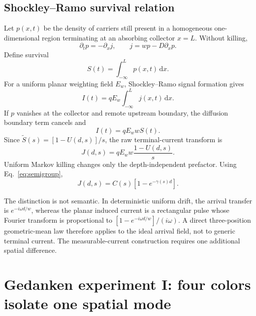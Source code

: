 \documentclass[11pt]{article}
\newcommand{\dd}{\mathrm{d}}
\begin{document}
\subsection{Shockley--Ramo survival relation}

Let $p(x,t)$ be the density of carriers still present in a homogeneous one-dimensional region terminating at an absorbing collector $x=L$. Without killing,
\begin{equation}
\partial_t p=-\partial_x j,
\qquad
j=wp-D\partial_xp.
\label{eq:continuity}
\end{equation}
Define survival
\begin{equation}
S(t)=\int_{-\infty}^{L}p(x,t)\,\dd x.
\end{equation}
For a uniform planar weighting field $E_w$, Shockley--Ramo signal formation \cite{Shockley1938,Ramo1939,Dabrowski1989} gives
\begin{equation}
I(t)=qE_w\int_{-\infty}^{L}j(x,t)\,\dd x.
\end{equation}
If $p$ vanishes at the collector and remote upstream boundary, the diffusion boundary term cancels and
\begin{equation}
\boxed{I(t)=qE_w w S(t).}
\label{eq:ramo_survival}
\end{equation}
Since $\widetilde S(s)=[1-U(d,s)]/s$, the raw terminal-current transform is
\begin{equation}
J(d,s)=qE_w w\frac{1-U(d,s)}{s}.
\label{eq:Jnokill}
\end{equation}
Uniform Markov killing changes only the depth-independent prefactor. Using Eq.~\eqref{eq:semigroup},
\begin{equation}
\boxed{J(d,s)=C(s)\left[1-e^{-\gamma(s)d}\right].}
\label{eq:Jaffine}
\end{equation}

The distinction is not semantic. In deterministic uniform drift, the arrival transfer is $e^{-i\omega d/w}$, whereas the planar induced current is a rectangular pulse whose Fourier transform is proportional to $[1-e^{-i\omega d/w}]/(i\omega)$. A direct three-position geometric-mean law therefore applies to the ideal arrival field, not to generic terminal current. The measurable-current construction requires one additional spatial difference.

\section{Gedanken experiment I: four colors isolate one spatial mode}
\end{document}

